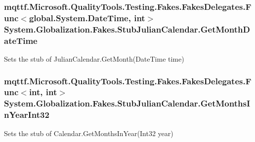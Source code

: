 \hypertarget{class_system_1_1_globalization_1_1_fakes_1_1_stub_julian_calendar_ada60b3c5d75096d447c4aeb4396ec253}{
\subsubsection[{Get\-Month\-Date\-Time}]{\setlength{\rightskip}{0pt plus 5cm}mqttf.\-Microsoft.\-Quality\-Tools.\-Testing.\-Fakes.\-Fakes\-Delegates.\-Func$<$global.\-System.\-Date\-Time, int$>$ System.\-Globalization.\-Fakes.\-Stub\-Julian\-Calendar.\-Get\-Month\-Date\-Time}}\label{class_system_1_1_globalization_1_1_fakes_1_1_stub_julian_calendar_ada60b3c5d75096d447c4aeb4396ec253}


Sets the stub of Julian\-Calendar.\-Get\-Month(\-Date\-Time time)

\hypertarget{class_system_1_1_globalization_1_1_fakes_1_1_stub_julian_calendar_a665405e89109c07cfc2a519e0c9c8558}{
\subsubsection[{Get\-Months\-In\-Year\-Int32}]{\setlength{\rightskip}{0pt plus 5cm}mqttf.\-Microsoft.\-Quality\-Tools.\-Testing.\-Fakes.\-Fakes\-Delegates.\-Func$<$int, int$>$ System.\-Globalization.\-Fakes.\-Stub\-Julian\-Calendar.\-Get\-Months\-In\-Year\-Int32}}\label{class_system_1_1_globalization_1_1_fakes_1_1_stub_julian_calendar_a665405e89109c07cfc2a519e0c9c8558}


Sets the stub of Calendar.\-Get\-Months\-In\-Year(\-Int32 year)


